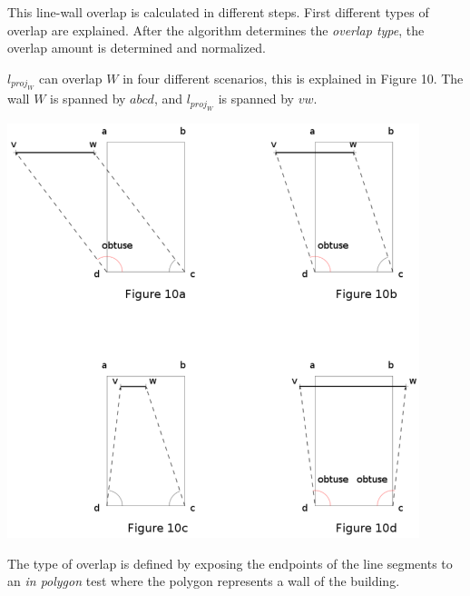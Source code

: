 \documentclass[10pt]{article}
\begin{document}
	This line-wall overlap is calculated in different steps.
	First different types of overlap are explained. After the algorithm
	determines the \emph{overlap type}, the overlap amount is determined and
	normalized.

	$l_{proj_W}$ can overlap $W$ in four different scenarios, this is explained
	in Figure 10. The wall $W$ is spanned by $abcd$, and $l_{proj_W}$ is spanned
	by $vw$.
	

	\begin{Figure}[!ht]
	\centering
	\includegraphics[width=12cm]{img/overlaytypes.png}
	\end{Figure}
		


	The type of overlap is defined by exposing the endpoints of the line
	segments to an \emph{in polygon} test where the polygon represents a 
	wall of the building.
\end{document}
